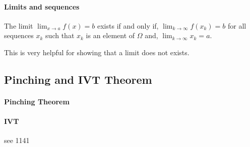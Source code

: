 \paragraph{Limits and sequences}
The limit \(\lim_{x\to a} f(x) = b\) exists if and only if,
\(\lim_{k\to\infty} f(x_k) = b\)  for all sequences \({x_k}\) such that 
\(x_k\) is an element of \(\Omega\) and,
\(\lim_{k\to\infty} x_k = a\).

This is very helpful for showing that a limit does not exists.

\subsection{Pinching and IVT Theorem}
\paragraph{Pinching Theorem}
\paragraph{IVT}
see 1141
